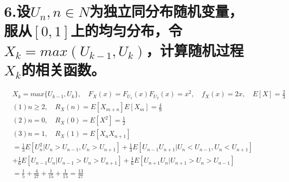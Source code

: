 \documentclass[UTF8]{ctexart}
\begin{document}
\section*{6.设$U_n,n\in N$为独立同分布随机变量，服从$[0,1]$上的均匀分布，令$X_k=max(
    U_{k-1},U_k)$，计算随机过程$X_k$的相关函数。}
\begin{equation*}
  \begin{aligned}
     & X_k=max\{U_{k-1},U_k\},\quad F_X(x)=F_{U_1}(x)F_{U_2}(x)=x^2,\quad
    f_X(x)=2x,\quad E[X]=\frac{2}{3}                                      \\
     & (1)n\geq2,\quad R_X(n)=E[X_{m+n}]E[X_m]=\frac{4}{9}                \\
     & (2)n=0,\quad R_X(0)=E[X^2]=\frac{1}{2}                             \\
     & (3)n=1,\quad R_X(1)=E[X_nX_{n+1}]                                  \\
     & =\frac{1}{3}E[U_n^2\lvert U_n>U_{n-1},U_n>
    U_{n+1}]+\frac{1}{3}E[U_{n-1}U_{n+1}\lvert U_n<U_{n-1},U_n<U_{n+1}]   \\
     & +\frac{1}{6}E[U_{n-1}U_n\lvert U_{n-1}>U_n>U_{n+1}]
    +\frac{1}{6}E[U_{n+1}U_n\lvert U_{n+1}>U_n>U_{n-1}]                   \\
     & =\frac{1}{5}+\frac{4}{27}+\frac{1}{15}+\frac{1}{15}=\frac{13}{27}  \\
  \end{aligned}
\end{equation*}
\end{document}
